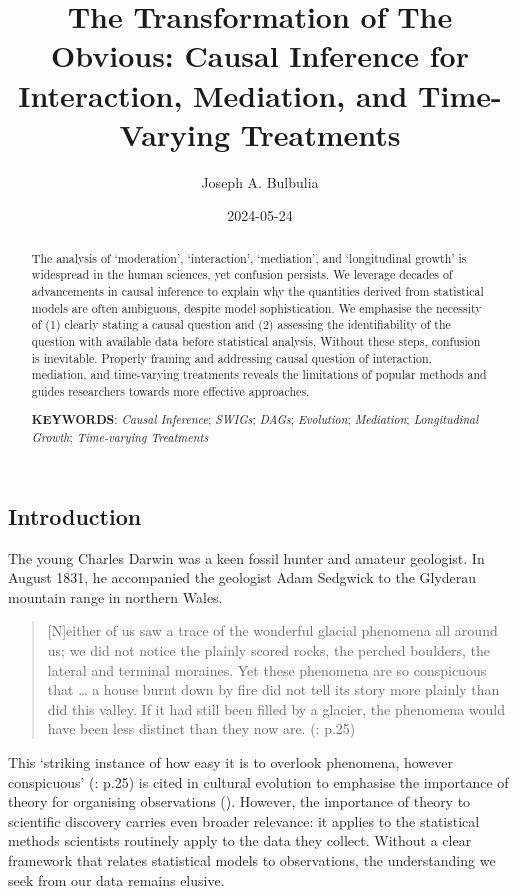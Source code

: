 \documentclass[
  single column]{article}
\title{The Transformation of The Obvious: Causal Inference for
Interaction, Mediation, and Time-Varying Treatments}
\author{Joseph A. Bulbulia}
\affil{%
             \small{     Victoria University of Wellington, New Zealand
          ORCID \textcolor[HTML]{A6CE39}{\aiOrcid} ~0000-0002-5861-2056 }
              }
\date{2024-05-24}
\begin{document}
\maketitle
\begin{abstract}
The analysis of `moderation', `interaction', `mediation', and
`longitudinal growth' is widespread in the human sciences, yet confusion
persists. We leverage decades of advancements in causal inference to
explain why the quantities derived from statistical models are often
ambiguous, despite model sophistication. We emphasise the necessity of
(1) clearly stating a causal question and (2) assessing the
identifiability of the question with available data before statistical
analysis. Without these steps, confusion is inevitable. Properly framing
and addressing causal question of interaction, mediation, and
time-varying treatments reveals the limitations of popular methods and
guides researchers towards more effective approaches.

\textbf{KEYWORDS}: \emph{Causal Inference}; \emph{SWIGs}; \emph{DAGs};
\emph{Evolution}; \emph{Mediation}; \emph{Longitudinal Growth};
\emph{Time-varying Treatments}
\end{abstract}

\subsection{Introduction}\label{introduction}

The young Charles Darwin was a keen fossil hunter and amateur geologist.
In August 1831, he accompanied the geologist Adam Sedgwick to the
Glyderau mountain range in northern Wales.

\begin{quote}
{[}N{]}either of us saw a trace of the wonderful glacial phenomena all
around us; we did not notice the plainly scored rocks, the perched
boulders, the lateral and terminal moraines. Yet these phenomena are so
conspicuous that \ldots{} a house burnt down by fire did not tell its
story more plainly than did this valley. If it had still been filled by
a glacier, the phenomena would have been less distinct than they now
are. (: p.25)
\end{quote}

This `striking instance of how easy it is to overlook phenomena, however
conspicuous' (: p.25) is cited
in cultural evolution to emphasise the importance of theory for
organising observations (). However, the importance of theory to scientific discovery
carries even broader relevance: it applies to the statistical methods
scientists routinely apply to the data they collect. Without a clear
framework that relates statistical models to observations, the
understanding we seek from our data remains elusive.
\end{document}

